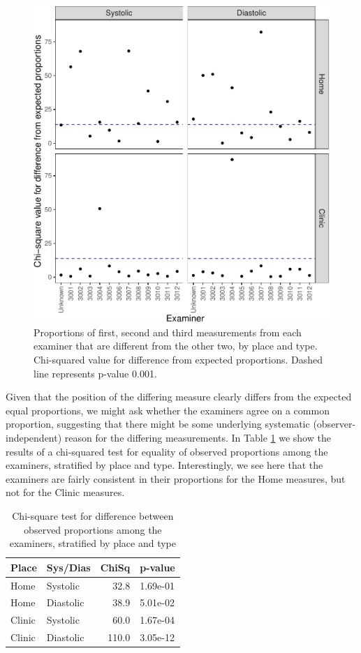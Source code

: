 \documentclass[
]{article}
\begin{document}
\begin{figure}
\centering
\includegraphics{Appendix_files/figure-latex/proportionChisq3-1.pdf}
\caption{\label{fig:proportionChisq3}Proportions of first, second and third measurements from each examiner that are different from the other two, by place and type. Chi-squared value for difference from expected proportions. Dashed line represents p-value 0.001.}
\end{figure}

Given that the position of the differing measure clearly differs from the expected equal proportions, we might ask whether the examiners agree on a common proportion, suggesting that there might be some underlying systematic (observer-independent) reason for the differing measurements.
In Table \ref{tab:ternaryChi2} we show the results of a chi-squared test for equality of observed proportions among the examiners, stratified by place and type.
Interestingly, we see here that the examiners are fairly consistent in their proportions for the Home measures, but not for the Clinic measures.

\begin{table}[!h]

\caption{\label{tab:ternaryChi2}Chi-square test for difference between observed proportions among the examiners, stratified by place and type}
\centering
\begin{tabular}[t]{llrl}
\toprule
Place & Sys/Dias & ChiSq & p-value\\
\midrule
Home & Systolic & 32.8 & 1.69e-01\\
Home & Diastolic & 38.9 & 5.01e-02\\
Clinic & Systolic & 60.0 & 1.67e-04\\
Clinic & Diastolic & 110.0 & 3.05e-12\\
\bottomrule
\end{tabular}
\end{table}
\end{document}
